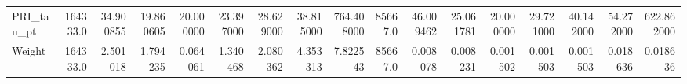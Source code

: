 \begin{tabular}{lrrrrrrrrrrrrrrrr}
PRI\_tau\_pt                  &  164333.0 &      34.900855 &     19.860605 &      20.000000 &      23.397000 &      28.629000 &      38.815000 &     764.408000 &  85667.0 &      46.009462 &     25.061781 &      20.000000 &      29.721000 &      40.142000 &      54.272000 &     622.862000 \\
Weight                      &  164333.0 &       2.501018 &      1.794235 &       0.064061 &       1.340468 &       2.080362 &       4.353313 &       7.822543 &  85667.0 &       0.008078 &      0.008231 &       0.001502 &       0.001503 &       0.001503 &       0.018636 &       0.018636 \\
\bottomrule
\end{tabular}

